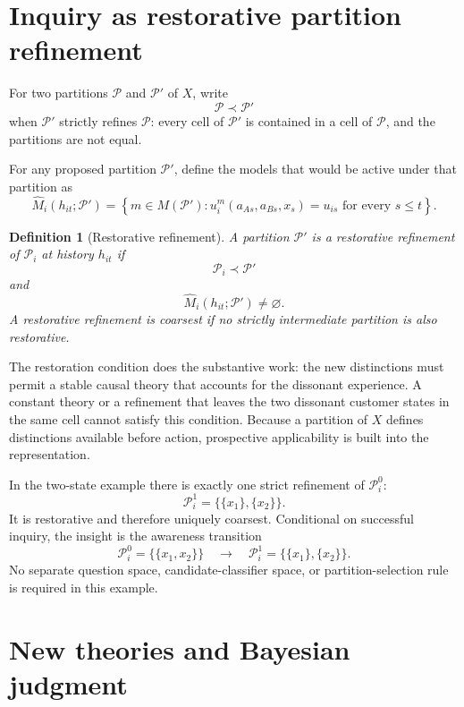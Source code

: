 \documentclass[11pt]{article}
\newtheorem{definition}{Definition}
\newcommand{\emptysetset}{\varnothing}
\begin{document}
\section{Inquiry as restorative partition refinement}

For two partitions $\mathcal P$ and $\mathcal P'$ of $X$, write
\[
\mathcal P\prec\mathcal P'
\]
when $\mathcal P'$ strictly refines $\mathcal P$: every cell of $\mathcal P'$ is contained in a cell of $\mathcal P$, and the partitions are not equal.

For any proposed partition $\mathcal P'$, define the models that would be active under that partition as
\begin{equation}
\widehat M_i(h_{it};\mathcal P')
=
\left\{
m\in M(\mathcal P'):
u_i^m(a_{As},a_{Bs},x_s)=u_{is}
\text{ for every }s\leq t
\right\}.
\label{eq:counterfactual-active-set}
\end{equation}

\begin{definition}[Restorative refinement]
A partition $\mathcal P'$ is a restorative refinement of $\mathcal P_i$ at history $h_{it}$ if
\[
\mathcal P_i\prec\mathcal P'
\]
and
\[
\widehat M_i(h_{it};\mathcal P')\neq\emptysetset.
\]
A restorative refinement is coarsest if no strictly intermediate partition is also restorative.
\end{definition}

The restoration condition does the substantive work: the new distinctions must permit a stable causal theory that accounts for the dissonant experience.  A constant theory or a refinement that leaves the two dissonant customer states in the same cell cannot satisfy this condition.  Because a partition of $X$ defines distinctions available before action, prospective applicability is built into the representation.

In the two-state example there is exactly one strict refinement of $\mathcal P_i^0$:
\begin{equation}
\mathcal P_i^1
=
\big\{\{x_1\},\{x_2\}\big\}.
\label{eq:refined-partition}
\end{equation}
It is restorative and therefore uniquely coarsest.  Conditional on successful inquiry, the insight is the awareness transition
\[
\mathcal P_i^0
=
\big\{\{x_1,x_2\}\big\}
\quad\longrightarrow\quad
\mathcal P_i^1
=
\big\{\{x_1\},\{x_2\}\big\}.
\]
No separate question space, candidate-classifier space, or partition-selection rule is required in this example.

\section{New theories and Bayesian judgment}
\end{document}
